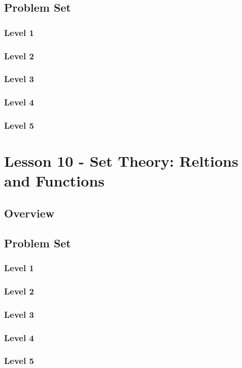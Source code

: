 \documentclass{article}
\begin{document}
\subsection{Problem Set}
\subsubsection{Level 1}
\subsubsection{Level 2}
\subsubsection{Level 3}
\subsubsection{Level 4}
\subsubsection{Level 5}
\pagebreak

\section{Lesson 10 - Set Theory: Reltions and Functions}
\subsection{Overview}
\subsection{Problem Set}
\subsubsection{Level 1}
\subsubsection{Level 2}
\subsubsection{Level 3}
\subsubsection{Level 4}
\subsubsection{Level 5}
\pagebreak
\end{document}
